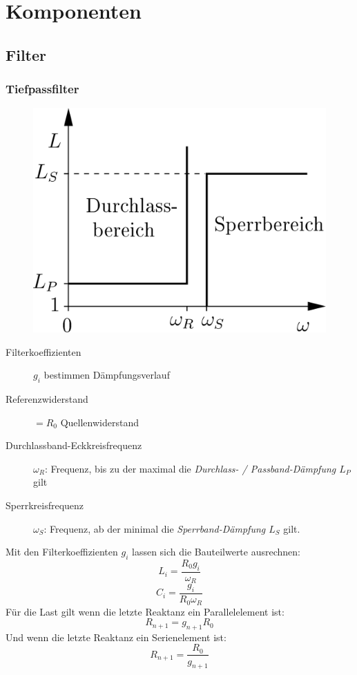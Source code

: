 \chapter{Komponenten}
\section{Filter}
\subsection{Tiefpassfilter}
\begin{figure}[H]
    \centering
    \includegraphics[width=.5\textwidth]{images/tiefpass.png}
\end{figure}
\begin{description}
    \item[Filterkoeffizienten] $g_i$ bestimmen Dämpfungsverlauf
    \item[Referenzwiderstand] $= R_0$ Quellenwiderstand
    \item[Durchlassband-Eckkreisfrequenz] $\omega_R$: Frequenz, bis zu der maximal die
        \emph{Durchlass- / Passband-Dämpfung $L_P$} gilt
    \item[Sperrkreisfrequenz] $\omega_S$: Frequenz, ab der minimal die
        \emph{Sperrband-Dämpfung $L_S$} gilt.
\end{description}
Mit den Filterkoeffizienten $g_i$ lassen sich die Bauteilwerte ausrechnen:
\begin{equation}
    L_i = \frac{R_0g_i}{\omega_R}
\end{equation}
\begin{equation}
    C_i = \frac{g_i}{R_0\omega_R}
\end{equation}
Für die Last gilt wenn die letzte Reaktanz ein Parallelelement ist:
\begin{equation}
    R_{n+1} = g_{n+1} R_0
\end{equation}
Und wenn die letzte Reaktanz ein Serienelement ist:
\begin{equation}
    R_{n+1} = \frac{R_0}{g_{n+1}}
\end{equation}

